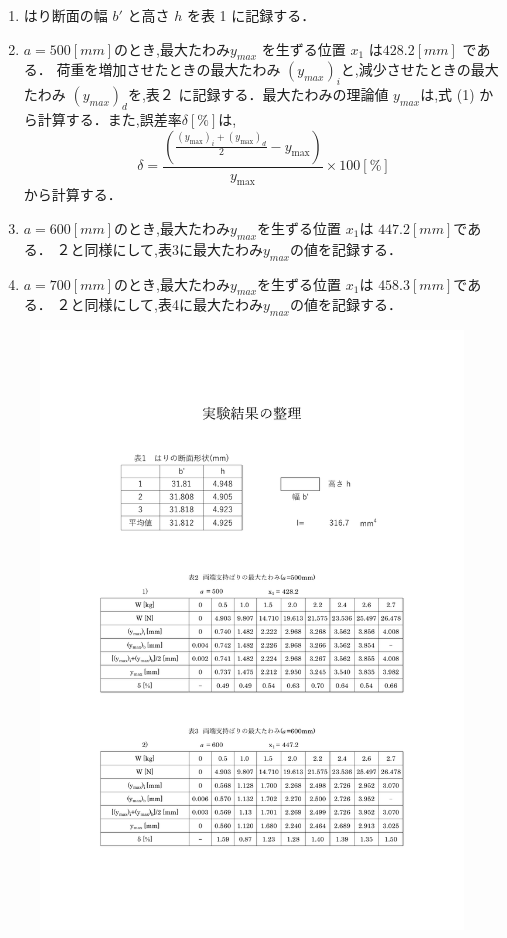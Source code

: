 \documentclass[a4paper,11pt]{jsarticle}
\begin{document}
\begin{enumerate}
  \item はり断面の幅 $b'$ と高さ $h$ を表 1 に記録する．
  \item $a = 500 [mm] $のとき,最大たわみ$y_{max}$ を生ずる位置 $x_1$ は$ 428.2 [mm]$ である．
  荷重を増加させたときの最大たわみ $(y_{max})_i$と,減少させたときの最大たわみ $(y_{max})_d$を,表２
  に記録する．最大たわみの理論値 $y_{max}$は,式 (1) から計算する．また,誤差率$ \delta [\%]$は,
  \begin{equation} 
    \delta = \frac{{\left(\frac{{(y_{\text{max}})_i + (y_{\text{max}})_d}}{2} - y_{\text{max}}\right)}}{{y_{\text{max}}}} \times 100[\%]
  \end{equation}
  から計算する．
  \item $a = 600 [mm] $のとき,最大たわみ$ y_{max}$を生ずる位置 $x_1$は $447.2 [mm] $である．
  ２と同様にして,表3に最大たわみ$y_{max}$の値を記録する．
  \item $a = 700 [mm] $のとき,最大たわみ$ y_{max}$を生ずる位置 $x_1$は $458.3 [mm] $である．
  ２と同様にして,表4に最大たわみ$y_{max}$の値を記録する．
\end{enumerate}

\begin{figure}[htbp]
  \centering
  \includegraphics[page=1,width=\textwidth,height=\textheight]{1.pdf}
\end{figure}
\end{document}

